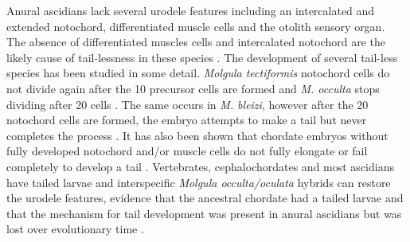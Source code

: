 Anural ascidians lack several urodele features including an intercalated and extended notochord, differentiated muscle cells and the otolith sensory organ. The absence of differentiated muscles cells and intercalated notochord are the likely cause of tail-lessness in these species \cite{miyamoto_formation_1985, swalla_interspecific_1990}. The development of several tail-less species has been studied in some detail. \textit{Molgula tectiformis} notochord cells do not divide again after the 10 precursor cells are formed and \textit{M. occulta} stops dividing after 20 cells \cite{jeffery_evolution_1999}. The same occurs in \textit{M. bleizi}, however after the 20 notochord cells are formed, the embryo attempts to make a tail but never completes the process \cite{swalla_novel_1993}. It has also been shown that chordate embryos without fully developed notochord and/or muscle cells do not fully elongate or fail completely to develop a tail \cite{jeffery_evolution_1999,takada_brachyury_2002,stemple_structure_2005}. 
Vertebrates, cephalochordates and most ascidians have tailed larvae and interspecific \textit{Molgula occulta/oculata} hybrids can restore the urodele features, evidence that the ancestral chordate had a tailed larvae and that the mechanism for tail development was present in anural ascidians but was lost over evolutionary time \cite{berrill_studies_1931,jeffery_factors_1992}.

